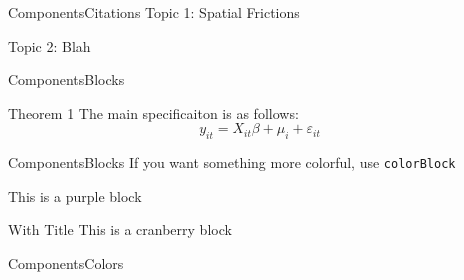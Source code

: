 \documentclass[aspectratio=169,t,11pt,table]{beamer}
\begin{document}
\begin{frame}{Components}{Citations}
  Topic 1: Spatial Frictions

  \vspace{5mm}
  Topic 2: Blah 
\end{frame}

\begin{frame}{Components}{Blocks}
  \begin{block}{Theorem 1}
  The main specificaiton is as follows: 
  $$
    y_{it} = X_{it} \beta + \mu_i + \varepsilon_{it}
  $$
  \end{block}
\end{frame}

\begin{frame}{Components}{Blocks}
  If you want something more colorful, use \texttt{colorBlock}
  \begin{purpleBlock}{}
    This is a purple block
  \end{purpleBlock}

  \begin{cranberryBlock}{With Title}
  This is a cranberry block
  \end{cranberryBlock}
\end{frame}

\begin{frame}{Components}{Colors}


  






\end{frame}
\end{document}
